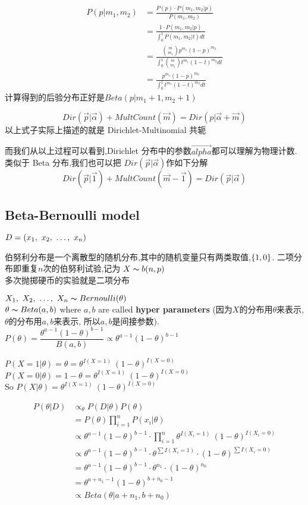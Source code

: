 \documentclass{article}
\begin{document}
\begin{align*} 
P(p|m_1,m_2) & = \frac{P(p)\cdot P(m_1,m_2|p)}{P(m_1,m_2)} \\ 
& = \frac{1\cdot P(m_1,m_2|p)}{\int_0^1 P(m_1,m_2|t)dt} \\ 
& = \frac{\binom{m}{m_1}p^{m_1}(1-p)^{m_2}}{\int_0^1 \binom{m}{m_1}t^{m_1}(1-t)^{m_2}dt} \\ 
& = \frac{p^{m_1}(1-p)^{m_2}}{\int_0^1 t^{m_1}(1-t)^{m_2}dt} 
\end{align*}
计算得到的后验分布正好是$Beta(p|m_1+1,m_2+1)$

\bigskip
$$
Dir(\overrightarrow{p}|\overrightarrow{\alpha}) + MultCount(\overrightarrow{m}) 
= Dir(p|\overrightarrow{\alpha}+\overrightarrow{m}) 
$$
以上式子实际上描述的就是 Dirichlet-Multinomial 共轭

而我们从以上过程可以看到,Dirichlet 分布中的参数$\overrightarrow{alpha}$都可以理解为物理计数.
类似于 Beta 分布,我们也可以把 $Dir(\overrightarrow{p}|\overrightarrow{\alpha})$作如下分解
$$
Dir(\overrightarrow{p}|\overrightarrow{1}) + MultCount(\overrightarrow{m}-\overrightarrow{1}) 
= Dir(\overrightarrow{p}|\overrightarrow{\alpha})
$$

\subsection{Beta-Bernoulli model}
$D = (x_1,~x_2,~\ldots,~x_n)$

伯努利分布是一个离散型的随机分布,其中的随机变量只有两类取值,$\{1,0\}$.
二项分布即重复$n$次的伯努利试验,记为 $X \thicksim{b}(n,p)$\\
多次抛掷硬币的实验就是二项分布

$X_1,~X_2,~\ldots,~X_n \thicksim{B}ernoulli(\theta)$\\
$\theta \thicksim{B}eta(a,b)$ where $a,b$ are called \textbf{hyper parameters}
(因为$X$的分布用$\theta$来表示, $\theta$的分布用$a,b$来表示, 所以$a,b$是间接参数).\\
$P(\theta) = \dfrac{\theta^{a-1}(1-\theta)^{b-1}}{B(a,b)} \propto \theta^{a-1}(1-\theta)^{b-1}$

\noindent
$P(X = 1|\theta) = \theta = \theta^{I(X=1)}\ (1-\theta)^{I(X=0)}$\\
$P(X = 0|\theta) = 1 - \theta = \theta^{I(X=1)}\ (1-\theta)^{I(X=0)}$\\
So $P(X|\theta) = \theta^{I(X=1)}\ (1-\theta)^{I(X=0)}$


$$
\begin{aligned}
P(\theta | D) 
& \propto_{\theta} P(D|\theta)P(\theta)\\
& = P(\theta) \prod_{i=1}^n P(x_i|\theta)\\
& \propto \theta^{a-1}(1-\theta)^{b-1} \cdot \prod_{i=1}^n \theta^{I(X_i=1)}\ (1-\theta)^{I(X_i=0)}\\
& \propto \theta^{a-1}(1-\theta)^{b-1} \cdot \theta^{\sum I(X_i=1)} \cdot (1-\theta)^{\sum I(X_i=0)}\\
& = \theta^{a-1}(1-\theta)^{b-1} \cdot \theta^{n_1} \cdot (1-\theta)^{n_0}\\
& = \theta^{a + n_1 - 1} (1-\theta)^{b + n_0 -1}\\
& \propto Beta(\theta | a + n_1, b + n_0)\\
\end{aligned}
$$
\end{document}
